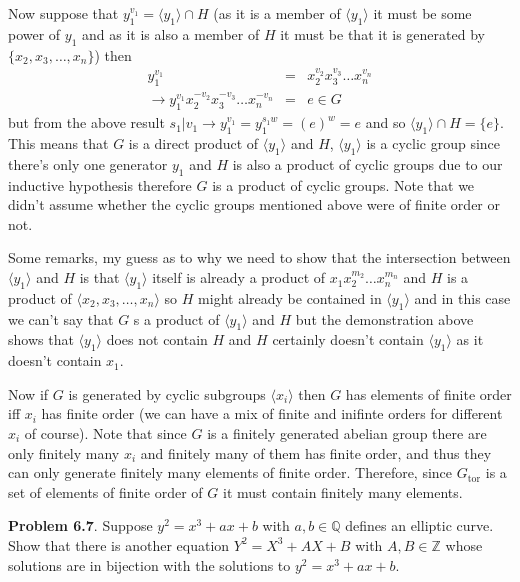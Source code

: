 \documentclass[aps,preprint,preprintnumbers,nofootinbib,showpacs,prd]{revtex4-1}
\newcommand{\nbea}{\begin{eqnarray*}}
\newcommand{\neea}{\end{eqnarray*}}
\DeclareMathOperator{\tor}{tor}
\begin{document}
Now suppose that $y_1^{v_1} = \langle y_1 \rangle \cap H$ (as it is a member of $\langle y_1 \rangle$ it must be some power of $y_1$ and as it is also a member of $H$ it must be that it is generated by $\{x_2, x_3, \ldots, x_n\}$) then
%
\nbea
y_1^{v_1} & = & x_2^{v_2} x_3^{v_3} \ldots x_n^{v_n} \\
\to y_1^{v_1} x_2^{-v_2} x_3^{-v_3} \ldots x_n^{-v_n} & = & e \in G
\neea
%
but from the above result $s_1|v_1 \to y_1^{v_1} = y_1^{s_1 w} = (e)^w = e$ and so $\langle y_1 \rangle \cap H = \{e\}$. This means that $G$ is a direct product of $\langle y_1 \rangle$ and $H$, $\langle y_1 \rangle$ is a cyclic group since there's only one generator $y_1$ and $H$ is also a product of cyclic groups due to our inductive hypothesis therefore $G$ is a product of cyclic groups. Note that we didn't assume whether the cyclic groups mentioned above were of finite order or not.

Some remarks, my guess as to why we need to show that the intersection between $\langle y_1 \rangle$ and $H$ is that $\langle y_1\rangle$ itself is already a product of $x_1 x_2^{m_2} \ldots x_n^{m_n}$ and $H$ is a product of $\langle x_2, x_3, \ldots, x_n \rangle$ so $H$ might already be contained in $\langle y_1\rangle$ and in this case we can't say that $G$ s a product of $\langle y_1\rangle$ and $H$ but the demonstration above shows that $\langle y_1\rangle$ does not contain $H$ and $H$ certainly doesn't contain $\langle y_1\rangle$ as it doesn't contain $x_1$.

Now if $G$ is generated by cyclic subgroups $\langle x_i \rangle$ then $G$ has elements of finite order iff $x_i$ has finite order (we can have a mix of finite and inifinte orders for different $x_i$ of course). Note that since $G$ is a finitely generated abelian group there are only finitely many $x_i$ and finitely many of them has finite order, and thus they can only generate finitely many elements of finite order. Therefore, since $G_{\tor}$ is a set of elements of finite order of $G$ it must contain finitely many elements.

{\bf Problem 6.7}. Suppose $y^2 = x^3 +ax+b$ with $a, b \in \mathbb{Q}$ defines an elliptic curve. Show that there is another equation $Y^2 = X^3 + AX + B$ with $A, B \in \mathbb{Z}$ whose solutions are in bijection with the solutions to $y^2 = x^3 +ax+b$.
\end{document}
